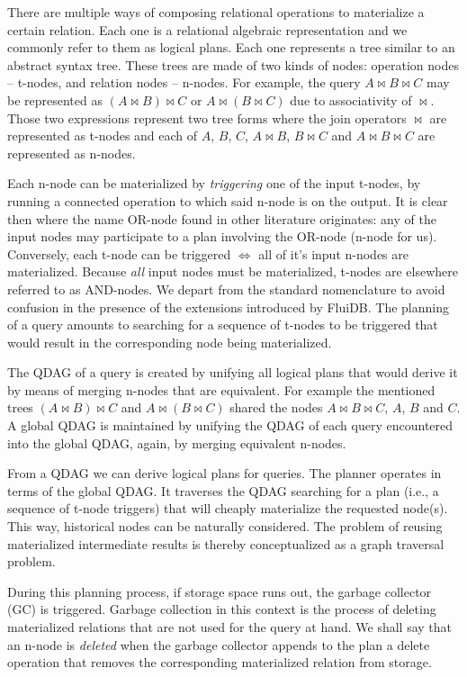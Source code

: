 There are multiple ways of composing relational operations to
  materialize a certain relation. Each one is a relational algebraic
  representation and we commonly refer to them as logical plans. Each
  one represents a tree similar to an abstract syntax tree. These
  trees are made of two kinds of nodes: operation nodes -- t-nodes, and
  relation nodes -- n-nodes. For example, the query \(A \Join B \Join C\)
  may be represented as \((A \Join B) \Join C\) or
  \(A \Join (B \Join C)\) due to associativity of \(\Join\). Those two expressions
  represent two tree forms where the join operators \(\Join\) are
  represented as t-nodes and each of \(A\), \(B\), \(C\),
  \(A \Join B\), \(B \Join C\) and \(A \Join B \Join C\) are
  represented as n-nodes. 

Each n-node can be materialized by \emph{triggering} one of the input
  t-nodes, by running a connected operation to which
  said n-node is on the output. It is clear then where the name
  OR-node found in other literature originates: any of the input nodes
  may participate to a plan involving the OR-node (n-node for
  us). Conversely, each t-node can be triggered \(\iff\) all of it's input
  n-nodes are materialized. Because \emph{all} input nodes must be
  materialized, t-nodes are elsewhere referred to as AND-nodes. We depart from
  the standard nomenclature to avoid confusion in the presence of the extensions
  introduced by FluiDB. The planning of a query amounts to searching for a sequence of t-nodes to be
triggered that would result in the corresponding node being materialized.

The QDAG of a query is created by unifying all logical plans 
that would derive it by means of
  merging n-nodes that are equivalent. For example the mentioned trees
  \((A \Join B) \Join C\) and \(A \Join (B \Join C)\) shared the nodes
  \(A \Join B \Join C\), \(A\), \(B\) and \(C\). A global QDAG is maintained by 
  unifying the QDAG of each query encountered into the global QDAG, again, 
  by merging equivalent n-nodes.

From a QDAG we can derive logical plans for queries. The
  planner operates in terms of the global QDAG. It traverses the QDAG
  searching for a plan (i.e., a sequence of t-node triggers) that will
  cheaply materialize the requested node(s). This way, historical nodes can be
  naturally considered. The problem of reusing materialized
  intermediate results is thereby conceptualized as a graph traversal
  problem.

During this planning process, if storage space runs out, the
  garbage collector (GC) is triggered. Garbage collection in this
  context is the process of deleting materialized relations that are
  not used for the query at hand. We shall say that an n-node is
  \emph{deleted} when the garbage collector appends to the plan a delete
  operation that removes the corresponding materialized relation
  from storage.

